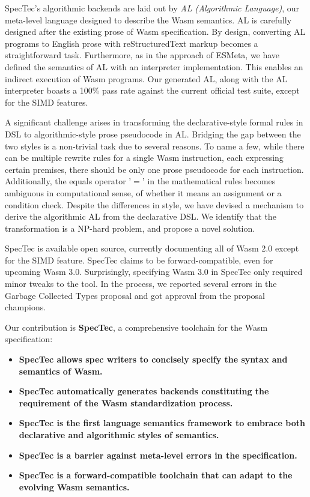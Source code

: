 SpecTec's algorithmic backends are laid out by \emph{AL (Algorithmic
Language)}, our meta-level language designed to describe the Wasm semantics.
AL is carefully designed after the existing prose of Wasm specification.  By
design, converting AL programs to English prose with reStructuredText markup
becomes a straightforward task.  Furthermore, as in the approach of ESMeta, we
have defined the semantics of AL with an interpreter implementation.  This
enables an indirect execution of Wasm programs.  Our generated AL, along with
the AL interpreter boasts a 100\% pass rate against the current official test
suite, except for the SIMD features.

A significant challenge arises in transforming the declarative-style formal
rules in DSL to algorithmic-style prose pseudocode in AL.  Bridging the gap
between the two styles is a non-trivial task due to several reasons.  To name a
few, while there can be multiple rewrite rules for a single Wasm instruction,
each expressing certain premises, there should be only one prose pseudocode for
each instruction.  Additionally, the equals operator '$=$' in the mathematical
rules becomes ambiguous in computational sense, of whether it means an
assignment or a condition check.  Despite the differences in style, we have
devised a mechanism to derive the algorithmic AL from the declarative DSL.  We
identify that the transformation is a NP-hard problem, and propose a novel
solution.

SpecTec is available open source, currently documenting all of Wasm 2.0 except
for the SIMD feature.  
SpecTec claims to be forward-compatible, even for upcoming Wasm 3.0.
Surprisingly, specifying Wasm 3.0 in SpecTec only required minor tweaks to the
tool.  In the process, we reported several errors in the Garbage Collected
Types proposal and got approval from the proposal champions.

Our contribution is \textbf{SpecTec}, a comprehensive toolchain for the Wasm specification:
\begin{itemize}
  \item
    \textbf{SpecTec allows spec writers to concisely specify the syntax and semantics of Wasm.}
  \item
    \textbf{SpecTec automatically generates backends constituting the requirement of the Wasm standardization process.}
  \item
    \textbf{SpecTec is the first language semantics framework to embrace both declarative and algorithmic styles of semantics.}
  \item
    \textbf{SpecTec is a barrier against meta-level errors in the specification.}
  \item
    \textbf{SpecTec is a forward-compatible toolchain that can adapt to the evolving Wasm semantics.}
\end{itemize}
